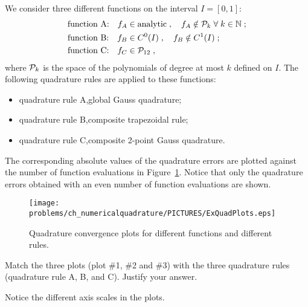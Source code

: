 
\begin{problem} \label{prb:QuadraturePlots}

We consider three different functions on the interval $I=[0,1]$:
\begin{align*}
\text{function A:}\quad f_A&\in \text{analytic}\;,\quad f_A\notin{\cal P}_k\; \forall\;k\in\mathbb{N}\;;\\
\text{function B:}\quad f_B&\in C^0(I)\;,\quad f_B\notin C^1(I)\;;\\
\text{function C:}\quad f_C&\in{\cal P}_{12}\;,
\end{align*}
where ${\cal P}_k$ is the space of the polynomials of degree at most $k$ defined on $I$.
The following quadrature rules are applied to these functions:
\begin{itemize}
\item quadrature rule A,\quad global Gauss quadrature;
\item quadrature rule B,\quad composite trapezoidal rule;
\item quadrature rule C,\quad composite 2-point Gauss quadrature.
\end{itemize}
The corresponding absolute values of the quadrature errors are plotted against the number of function evaluations in Figure~\ref{fig:QuadraturePlots}.
Notice that only the quadrature errors obtained with an even number of function evaluations are shown.

\begin{figure}[hbt]
\hspace{8mm}
\texttt{[image: \\problems/ch\_numericalquadrature/PICTURES/ExQuadPlots.eps]}
\caption{Quadrature convergence plots for different functions and different rules.}
\label{fig:QuadraturePlots}
\end{figure}


\begin{subproblem}[3] \label{prb:QuadraturePlots_1}
Match the three plots (plot \#1, \#2 and \#3) with the three quadrature rules (quadrature rule A, B, and  C). Justify your answer.\\[1.5ex]
\begin{hint}
Notice the different axis scales in the plots.
\end{hint}


\end{subproblem}
\end{problem}
